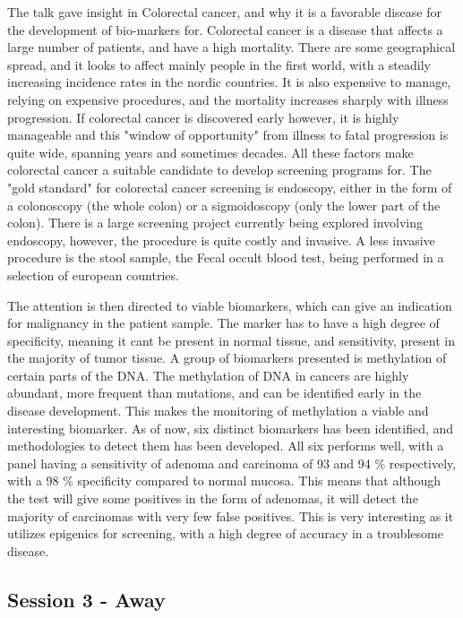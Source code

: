 \documentclass[12p]{article}
\begin{document}
The talk gave insight in Colorectal cancer, and why it is a favorable disease for the development of bio-markers for.
Colorectal cancer is a disease that affects a large number of patients, and have a high mortality.
There are some geographical spread, and it looks to affect mainly people in the first world, with a steadily increasing incidence rates in the nordic countries.
It is also expensive to manage, relying on expensive procedures, and the mortality increases sharply with illness progression.
If colorectal cancer is discovered early however, it is highly manageable and this "window of opportunity" from illness to fatal progression is quite wide, spanning years and sometimes decades.
All these factors make colorectal cancer a suitable candidate to develop screening programs for.
The "gold standard" for colorectal cancer screening is endoscopy, either in the form of a colonoscopy (the whole colon) or a sigmoidoscopy (only the lower part of the colon).
There is a large screening project currently being explored involving endoscopy, however, the procedure is quite costly and invasive.
A less invasive procedure is the stool sample, the Fecal occult blood test, being performed in a selection of european countries.

The attention is then directed to viable biomarkers, which can give an indication for malignancy in the patient sample.
The marker has to have a high degree of specificity, meaning it cant be present in normal tissue, and sensitivity, present in the majority of tumor tissue.
A group of biomarkers presented is methylation of certain parts of the DNA.
The methylation of DNA in cancers are highly abundant, more frequent than mutations, and can be identified early in the disease development.
This makes the monitoring of methylation a viable and interesting biomarker.
As of now, six distinct biomarkers has been identified, and methodologies to detect them has been developed.
All six performs well, with a panel having a sensitivity of adenoma and carcinoma of 93 and 94 \% respectively, with a 98 \% specificity compared to normal mucosa.
This means that although the test will give some positives in the form of adenomas, it will detect the majority of carcinomas with very few false positives.
This is very interesting as it utilizes epigenics for screening, with a high degree of accuracy in a troublesome disease.

\subsection*{Session 3 - Away}
\end{document}

